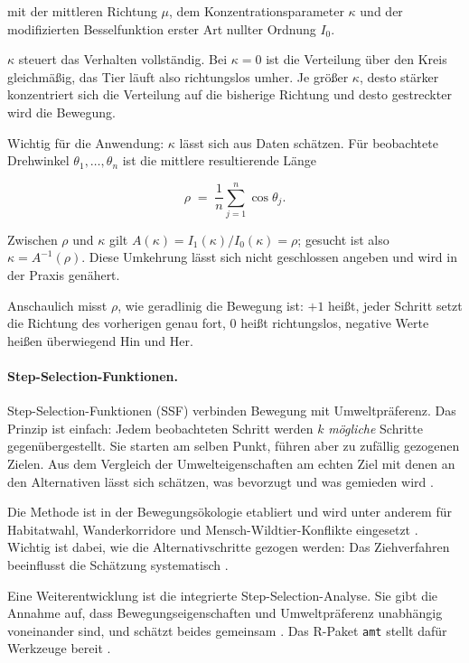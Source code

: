 \documentclass[12pt,a4paper]{report}
\begin{document}
mit der mittleren Richtung $\mu$, dem Konzentrationsparameter $\kappa$ und der
modifizierten Besselfunktion erster Art nullter Ordnung $I_{0}$.

$\kappa$ steuert das Verhalten vollständig. Bei $\kappa = 0$ ist die Verteilung über den
Kreis gleichmäßig, das Tier läuft also richtungslos umher. Je größer $\kappa$, desto stärker
konzentriert sich die Verteilung auf die bisherige Richtung und desto gestreckter wird die
Bewegung.

Wichtig für die Anwendung: $\kappa$ lässt sich aus Daten schätzen. Für beobachtete
Drehwinkel $\theta_{1},\dots,\theta_{n}$ ist die mittlere resultierende Länge

\begin{equation}
    \rho \;=\; \frac{1}{n}\sum_{j=1}^{n} \cos\theta_{j}.
    \label{eq:rho}
\end{equation}

Zwischen $\rho$ und $\kappa$ gilt $A(\kappa) = I_{1}(\kappa)/I_{0}(\kappa) = \rho$; gesucht
ist also $\kappa = A^{-1}(\rho)$. Diese Umkehrung lässt sich nicht geschlossen angeben und
wird in der Praxis genähert.

Anschaulich misst $\rho$, wie geradlinig die Bewegung ist: $+1$ heißt, jeder Schritt setzt
die Richtung des vorherigen genau fort, $0$ heißt richtungslos, negative Werte heißen
überwiegend Hin und Her.

\paragraph{Step-Selection-Funktionen.}

Step-Selection-Funktionen (SSF) verbinden Bewegung mit Umweltpräferenz. Das Prinzip ist
einfach: Jedem beobachteten Schritt werden $k$ \emph{mögliche} Schritte gegenübergestellt.
Sie starten am selben Punkt, führen aber zu zufällig gezogenen Zielen. Aus dem Vergleich
der Umwelteigenschaften am echten Ziel mit denen an den Alternativen lässt sich schätzen,
was bevorzugt und was gemieden wird \cite{Thurfjell2014}.

Die Methode ist in der Bewegungsökologie etabliert und wird unter anderem für Habitatwahl,
Wanderkorridore und Mensch-Wildtier-Konflikte eingesetzt \cite{Thurfjell2014}. Wichtig ist
dabei, wie die Alternativschritte gezogen werden: Das Ziehverfahren beeinflusst die
Schätzung systematisch \cite{Forester2009}.

Eine Weiterentwicklung ist die integrierte Step-Selection-Analyse. Sie gibt die Annahme auf,
dass Bewegungseigenschaften und Umweltpräferenz unabhängig voneinander sind, und schätzt
beides gemeinsam \cite{Avgar2016}. Das R-Paket \texttt{amt} stellt dafür Werkzeuge bereit
\cite{Signer2019}.
\end{document}
